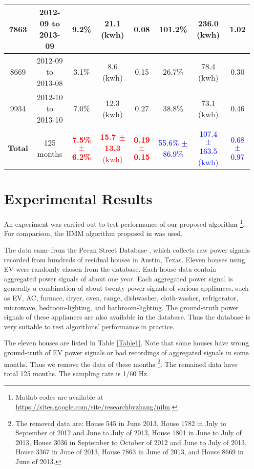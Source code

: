 \documentclass[conference]{IEEEtran}
\begin{document}
\begin{table*}[thp]
\begin{tabular}{c|c|c|c|c| c|c|c}
7863                   &  2012-09 to 2013-09    &  9.2\%     & 21.1 (kwh) &    0.08        &    101.2\%       &   236.0 (kwh) & 1.02            \\ \hline
8669                   &   2012-09 to 2013-08    &  3.1\%     & 8.6 (kwh) &   0.15      &    26.7\%           &78.4 (kwh) &  0.30   \\   \hline
9934                   &  2012-10 to 2013-10   &  7.0\%      & 12.3 (kwh) &  0.27       &       38.8\%       & 73.1 (kwh) &  0.46          \\  \hline\hline
\textbf{Total}    &  125 months            &  \textcolor{red}{\textbf{7.5\% $\pm$ 6.2\%}}     &  \textcolor{red}{\textbf{15.7 $\pm$ 13.3} (kwh)} &  \textcolor{red}{\textbf{0.19 $\pm$ 0.15 }}      &     \textcolor{blue}{55.6\% $\pm$ 86.9\%}       & \textcolor{blue}{107.4  $\pm$ 163.5 (kwh)}     &  \textcolor{blue}{ 0.68 $\pm$ 0.97}      \\
\hline\hline
\end{tabular}
\end{table*}




\section{Experimental Results}
\label{sec:experiments}

An experiment was carried out to test performance of our proposed algorithm \footnote{Matlab codes are available at \url{https://sites.google.com/site/researchbyzhang/nilm}.}. For comparison, the HMM algorithm proposed in \cite{parson2012non} was used.



The data came from the Pecan Street Database \cite{PecanStreetDatabase}, which collects raw power signals recorded from hundreds of residual houses in Austin, Texas. Eleven houses using EV were randomly chosen from the database. Each house data contain aggregated power signals of about one year. Each aggregated power signal is generally a combination of about twenty power signals of various appliances, such as EV, AC, furnace, dryer, oven, range, dishwasher, cloth-washer, refrigerator, microwave, bedroom-lighting, and bathroom-lighting. The ground-truth power signals of these appliances are also available in the database. Thus the database is very suitable to test algorithms' performance in practice.

The eleven houses are listed in Table \ref{Table1}. Note that some houses have wrong ground-truth of EV power signals or bad recordings of aggregated signals in some months. Thus we remove the data of these months \footnote{The removed data are: House 545 in June 2013, House 1782 in July to September of 2012 and June to July of 2013, House 1801 in June to July of 2013, House 3036 in September to October of 2012 and June to July of 2013, House 3367 in June of 2013, House 7863 in June of 2013, and House 8669 in June of 2013.}. The remained data have total 125 months. The sampling rate is 1/60 Hz.
\end{document}
